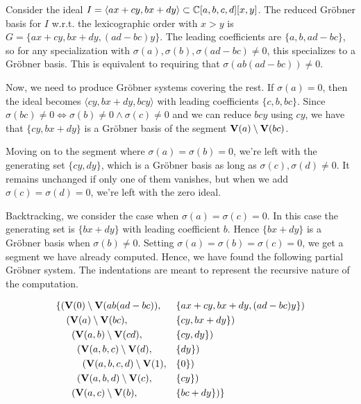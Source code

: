 \begin{example}\upshape
  Consider the ideal $I = \langle ax + cy, bx + dy \rangle \subset \mathbb{C}[a, b, c, d][x, y]$. The reduced Gröbner basis for $I$ w.r.t. the lexicographic order with $x > y$ is $G = \{ax + cy, bx + dy, (ad - bc)y\}$. The leading coefficients are $\{a, b, ad - bc\}$, so for any specialization with $\sigma(a), \sigma(b), \sigma(ad - bc) \neq 0$, this specializes to a Gröbner basis. This is equivalent to requiring that $\sigma(ab(ad-bc)) \neq 0$.

  Now, we need to produce Gröbner systems covering the rest. If $\sigma(a) = 0$, then the ideal becomes $\langle cy, bx + dy, bcy \rangle$ with leading coefficients $\{c, b, bc\}$. Since $\sigma(bc) \neq 0 \iff \sigma(b) \neq 0 \land \sigma(c) \neq 0$ and we can reduce $bcy$ using $cy$, we have that $\{cy, bx + dy\}$ is a Gröbner basis of the segment $\operatorname{\mathbf V}(a) \setminus \operatorname{\mathbf V}(bc)$.

  Moving on to the segment where $\sigma(a) = \sigma(b) = 0$, we're left with the generating set $\{cy, dy\}$, which is a Gröbner basis as long as $\sigma(c), \sigma(d) \neq 0$. It remains unchanged if only one of them vanishes, but when we add $\sigma(c) = \sigma(d) = 0$, we're left with the zero ideal.

  Backtracking, we consider the case when $\sigma(a) = \sigma(c) = 0$. In this case the generating set is $\{bx + dy\}$ with leading coefficient $b$. Hence $\{bx + dy\}$ is a Gröbner basis when $\sigma(b) \neq 0$. Setting $\sigma(a) = \sigma(b) = \sigma(c) = 0$, we get a segment we have already computed. Hence, we have found the following partial Gröbner system. The indentations are meant to represent the recursive nature of the computation.

  \begin{align*}
    \{&(\operatorname{\mathbf V}(0) \setminus \operatorname{\mathbf V}(ab(ad-bc)),& &\{ax + cy, bx + dy, (ad-bc)y\}) \\
      &\;\; (\operatorname{\mathbf V}(a) \setminus \operatorname{\mathbf V}(bc),& &\{cy, bx + dy\}) \\
      &\;\; \;\;(\operatorname{\mathbf V}(a, b) \setminus \operatorname{\mathbf V}(cd),& &\{cy, dy\}) \\
      &\;\; \;\; \;\;(\operatorname{\mathbf V}(a, b, c) \setminus \operatorname{\mathbf V}(d),& &\{dy\}) \\
      &\;\; \;\; \;\; \;\;(\operatorname{\mathbf V}(a, b, c, d) \setminus \operatorname{\mathbf V}(1),& &\{0\}) \\
      &\;\; \;\; \;\;(\operatorname{\mathbf V}(a, b, d) \setminus \operatorname{\mathbf V}(c),& &\{cy\})\\
      &\;\; \;\;(\operatorname{\mathbf V}(a, c) \setminus \operatorname{\mathbf V}(b), &&\{bc + dy\})\}
  \end{align*}


\end{example}
